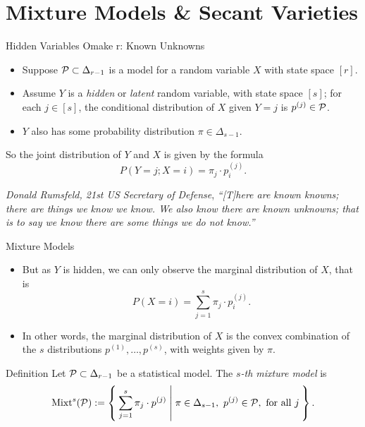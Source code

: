 \section{Mixture Models \& Secant Varieties}

\begin{frame}{Hidden Variables Omake
r: Known Unknowns}
    \begin{itemize}
    \item Suppose $\mathcal{P} \subset \Delta_{r-1}$ is a model for a random variable $X$ with state space $[r]$.
    \item Assume $Y$ is a \emph{hidden} or \emph{latent} random variable, with state space $[s]$; for each $j \in [s]$, the conditional distribution of $X$ given $Y = j$ is $p^{(j)} \in \mathcal{P}$. 
    \item $Y$ also has some probability distribution $\pi \in \Delta_{s-1}$.
    \end{itemize}

    So the joint distribution of $Y$ and $X$ is given by the formula
    $$ P(Y = j; X = i) = \pi_{j} \cdot p_{i}^{(j)}. $$

    \begin{block}{\emph{Donald Rumsfeld, 21st US Secretary of Defense}, \cite{DR2002}}
        \emph{``[T]here are known knowns; there are things we know we know. We also know there are known unknowns; that is to say we know there are some things we do not know.''}
    \end{block}

\end{frame}

\begin{frame}{Mixture Models}

    \begin{itemize}
    \item But as $Y$ is hidden, we can only observe the marginal distribution of $X$, that is
    $$ P(X = i) = \sum_{j = 1}^{s} \pi_{j} \cdot p_{i}^{(j)}. $$
    \item In other words, the marginal distribution of $X$ is the convex combination of the $s$ distributions $p^{(1)}, \ldots, p^{(s)}$, with weights given by $\pi$.
    \end{itemize}

    \begin{block}{Definition \cite{BSSSMD2009}}
        Let $\mathcal{P} \subset \Delta_{r-1}$ be a statistical model. The \emph{$s$-th mixture model} is
        $$ \Mixt^{s}(\mc{P}) := \Set{ \sum_{j = 1}^{s} \pi_{j}\cdot p^{(j)} | \pi \in \Delta_{s-1},\ p^{(j)} \in \mc{P}, \text{ for all } j }. $$
    \end{block}

\end{frame}

